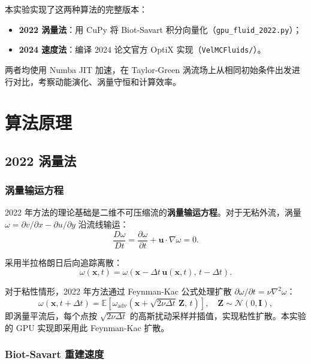 \documentclass[12pt,a4paper]{article}
\begin{document}
本实验实现了这两种算法的完整版本：
\begin{itemize}
    \item \textbf{2022 涡量法}：用 CuPy 将 Biot-Savart 积分向量化（\texttt{gpu\_fluid\_2022.py}）；
    \item \textbf{2024 速度法}：编译 2024 论文官方 OptiX 实现（\texttt{VelMCFluids/}）。
\end{itemize}

两者均使用 Numba JIT 加速，在 Taylor-Green 涡流场上从相同初始条件出发进行对比，考察动能演化、涡量守恒和计算效率。

\section{算法原理}

\subsection{2022 涡量法}

\subsubsection{涡量输运方程}

2022 年方法的理论基础是二维不可压缩流的\textbf{涡量输运方程}。对于无粘外流，涡量 $\omega = \partial v/\partial x - \partial u/\partial y$ 沿流线输运：
\begin{equation}
\frac{D\omega}{Dt} = \frac{\partial \omega}{\partial t} + \boldsymbol{u}\cdot\nabla\omega = 0.
\label{eq:vort_transport}
\end{equation}

采用半拉格朗日后向追踪离散：
\begin{equation}
\omega(\boldsymbol{x}, t) = \omega(\boldsymbol{x} - \Delta t\,\boldsymbol{u}(\boldsymbol{x},t),\, t-\Delta t).
\end{equation}

对于粘性情形，2022 年方法通过 Feynman-Kac 公式处理扩散 $\partial\omega/\partial t = \nu\nabla^2\omega$：
\begin{equation}
\omega(\boldsymbol{x}, t+\Delta t) = \mathbb{E}\left[\omega_{\text{adv}}(\boldsymbol{x} + \sqrt{2\nu\Delta t}\,\boldsymbol{Z},\, t)\right],\quad \boldsymbol{Z}\sim\mathcal{N}(0,\boldsymbol{I}),
\end{equation}
即涡量平流后，每个点按 $\sqrt{2\nu\Delta t}$ 的高斯扰动采样并插值，实现粘性扩散。本实验的 GPU 实现即采用此 Feynman-Kac 扩散。

\subsubsection{Biot-Savart 重建速度}
\end{document}
